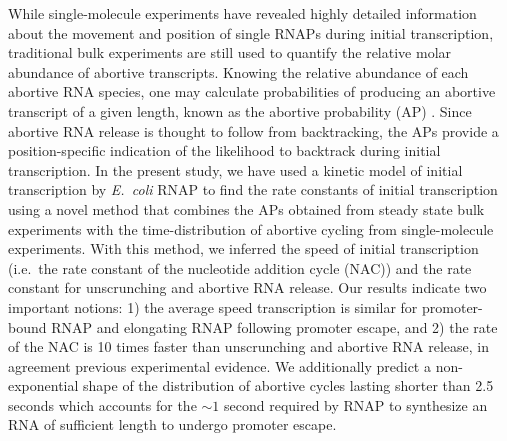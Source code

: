 While single-molecule experiments have revealed highly detailed information
about the movement and position of single RNAPs during initial transcription,
traditional bulk experiments are still used to quantify the relative molar
abundance of abortive transcripts. Knowing the relative abundance of each
abortive RNA species, one may calculate probabilities of producing an
abortive transcript of a given length, known as the abortive probability
(AP) \cite{hsu_promoter_2002, hsu_quantitative_1996}. Since abortive RNA
release is thought to follow from backtracking, the APs provide a
position-specific indication of the likelihood to backtrack during initial
transcription. In the present study, we have used a kinetic model of initial
transcription by \textit{E.\ coli} RNAP to find the rate constants of initial
transcription using a novel method that combines the APs obtained from steady
state bulk experiments with the time-distribution of abortive cycling from
single-molecule experiments. With this method, we inferred the speed of
initial transcription (i.e.\ the rate constant of the nucleotide addition
cycle (NAC)) and the rate constant for unscrunching and abortive RNA release.
Our results indicate two important notions: 1) the average speed transcription
is similar for promoter-bound RNAP and elongating RNAP following promoter
escape, and 2) the rate of the NAC is 10 times faster than unscrunching and
abortive RNA release, in agreement previous experimental evidence. We
additionally predict a non-exponential shape of the distribution of abortive
cycles lasting shorter than 2.5 seconds which accounts for the $\sim1$ second
required by RNAP to synthesize an RNA of sufficient length to undergo promoter
escape.
